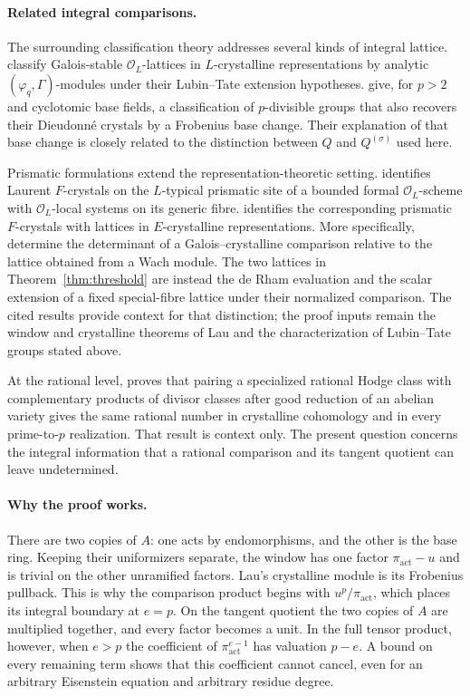 \documentclass[11pt]{article}
\theoremstyle{definition}\newtheorem{definition}[theorem]{Definition}
\theoremstyle{remark}\newtheorem{remark}[theorem]{Remark}
\newcommand{\OO}{\mathcal O}
\newcommand{\act}{\mathrm{act}}
\begin{document}
\paragraph{Related integral comparisons.}
The surrounding classification theory addresses several kinds of integral lattice. \citet[Theorem~(0.1), p.~442]{KisinRen} classify Galois-stable $\OO_L$-lattices in $L$-crystalline representations by analytic $(\varphi_q,\Gamma)$-modules under their Lubin--Tate extension hypotheses. \citet[Theorem~1 and introduction, author-version pp.~2--3]{CaisLau} give, for $p>2$ and cyclotomic base fields, a classification of $p$-divisible groups that also recovers their Dieudonn\'e crystals by a Frobenius base change. Their explanation of that base change is closely related to the distinction between $Q$ and $Q^{(\sigma)}$ used here.

Prismatic formulations extend the representation-theoretic setting. \citet[Theorem~1.3, pp.~788--789]{Marks} identifies Laurent $F$-crystals on the $L$-typical prismatic site of a bounded formal $\OO_L$-scheme with $\OO_L$-local systems on its generic fibre. \citet[Theorem~1.5, version~2, p.~2]{Pham} identifies the corresponding prismatic $F$-crystals with lattices in $E$-crystalline representations. More specifically, \citet[Section~3.2, Proposition~3.2.1, p.~31]{SchneiderVenjakob} determine the determinant of a Galois--crystalline comparison relative to the lattice obtained from a Wach module. The two lattices in Theorem~\ref{thm:threshold} are instead the de Rham evaluation and the scalar extension of a fixed special-fibre lattice under their normalized comparison. The cited results provide context for that distinction; the proof inputs remain the window and crystalline theorems of Lau and the characterization of Lubin--Tate groups stated above.

At the rational level, \citet[Theorem~1.1, pp.~1--2]{OpenAI} proves that pairing a specialized rational Hodge class with complementary products of divisor classes after good reduction of an abelian variety gives the same rational number in crystalline cohomology and in every prime-to-$p$ realization. That result is context only. The present question concerns the integral information that a rational comparison and its tangent quotient can leave undetermined.

\paragraph{Why the proof works.}
There are two copies of $A$: one acts by endomorphisms, and the other is the base ring. Keeping their uniformizers separate, the window has one factor $\pi_{\act}-u$ and is trivial on the other unramified factors. Lau's crystalline module is its Frobenius pullback. This is why the comparison product begins with $u^p/\pi_{\act}$, which places its integral boundary at $e=p$. On the tangent quotient the two copies of $A$ are multiplied together, and every factor becomes a unit. In the full tensor product, however, when $e>p$ the coefficient of $\pi_{\act}^{e-1}$ has valuation $p-e$. A bound on every remaining term shows that this coefficient cannot cancel, even for an arbitrary Eisenstein equation and arbitrary residue degree.
\end{document}
